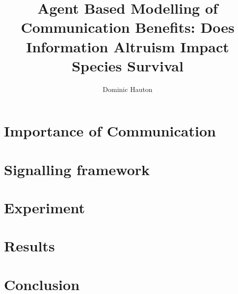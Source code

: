 \documentclass[a4paper,10pt,twocolumn]{report}
\title{Agent Based Modelling of Communication Benefits: Does Information Altruism Impact Species Survival}
\author{Dominic Hauton}
\begin{document}
\maketitle

\section{Importance of Communication}

\section{Signalling framework}

\section{Experiment}

\section{Results}

\section{Conclusion}
\end{document}

